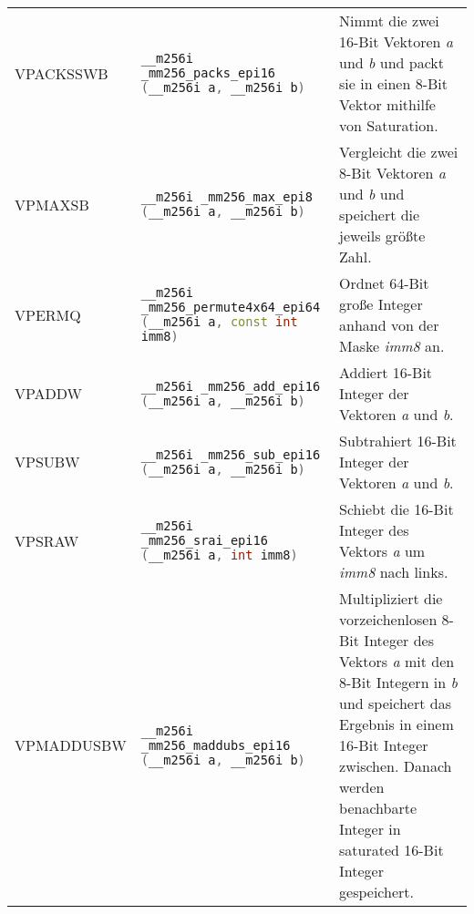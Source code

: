 \begin{table}[ht]
\begin{footnotesize}
\begin{tabularx}{\textwidth}{l X X}
      VPACKSSWB       & \lstinline[language=C++]{__m256i _mm256_packs_epi16 (__m256i a, __m256i b)} & Nimmt die zwei 16-Bit Vektoren \emph{a} und \emph{b} und packt sie in einen 8-Bit Vektor mithilfe von Saturation.                                                                                                                           \\
      VPMAXSB         & \lstinline[language=C++]{__m256i _mm256_max_epi8 (__m256i a, __m256i b)}    & Vergleicht die zwei 8-Bit Vektoren \emph{a} und \emph{b} und speichert die jeweils größte Zahl.                                                                                                                                                 \\
      VPERMQ          & \lstinline[language=C++]{__m256i _mm256_permute4x64_epi64 (__m256i a, const int imm8)}    & Ordnet 64-Bit große Integer anhand von der Maske \emph{imm8} an.                                                                                                                                                                                              \\
      VPADDW          & \lstinline[language=C++]{__m256i _mm256_add_epi16 (__m256i a, __m256i b)}    & Addiert 16-Bit Integer der Vektoren \emph{a} und \emph{b}.                                                                                                                                                                                       \\
      VPSUBW          & \lstinline[language=C++]{__m256i _mm256_sub_epi16 (__m256i a, __m256i b)}    & Subtrahiert 16-Bit Integer der Vektoren \emph{a} und \emph{b}.                                                                                                                                                                                      \\
      VPSRAW          & \lstinline[language=C++]{__m256i _mm256_srai_epi16 (__m256i a, int imm8)}    & Schiebt die 16-Bit Integer des Vektors \emph{a} um \emph{imm8} nach links.                                                                                                                                                                         \\
      VPMADDUSBW      & \lstinline[language=C++]{__m256i _mm256_maddubs_epi16 (__m256i a, __m256i b)}    & Multipliziert die vorzeichenlosen 8-Bit Integer des Vektors \emph{a} mit den 8-Bit Integern in \emph{b} und speichert das Ergebnis in einem 16-Bit Integer zwischen. Danach werden benachbarte Integer in saturated 16-Bit Integer gespeichert.                         \\
      \bottomrule
    \end{tabularx}
  \end{footnotesize}
  \rmfamily
\end{table}

